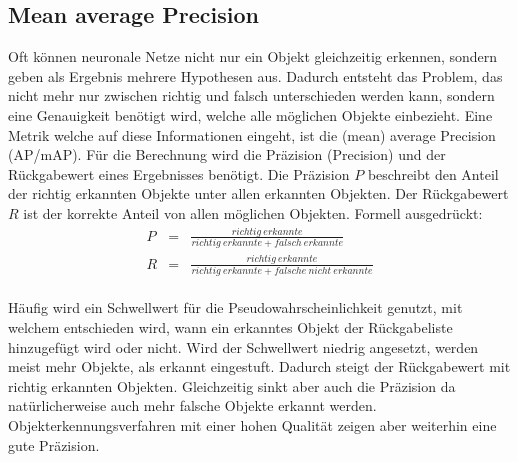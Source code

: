 \documentclass[a4paper,12pt,oneside]{article}
\begin{document}
  \subsection{Mean average Precision}\label{s.map}
Oft können neuronale Netze nicht nur ein Objekt gleichzeitig erkennen, sondern geben als Ergebnis mehrere Hypothesen aus. Dadurch entsteht das Problem, das nicht mehr nur zwischen richtig und falsch unterschieden werden kann, sondern eine Genauigkeit benötigt wird, welche alle möglichen Objekte einbezieht. Eine Metrik welche auf diese Informationen eingeht, ist die (mean) average Precision (AP/mAP). Für die Berechnung wird die Präzision (Precision) und der Rückgabewert eines Ergebnisses benötigt. Die Präzision $P$ beschreibt den Anteil der richtig erkannten Objekte unter allen erkannten Objekten. Der Rückgabewert $R$ ist der korrekte Anteil von allen möglichen Objekten. Formell ausgedrückt:\\
\begin{eqnarray}
P&=&\frac{richtig\medspace erkannte}{richtig\medspace erkannte + falsch\medspace erkannte}\\
R&=&\frac{richtig\medspace erkannte}{richtig\medspace erkannte + falsche\medspace nicht\medspace erkannte}
\end{eqnarray}\\
Häufig wird ein Schwellwert für die Pseudowahrscheinlichkeit genutzt, mit welchem entschieden wird, wann ein erkanntes Objekt der Rückgabeliste hinzugefügt wird oder nicht. Wird der Schwellwert niedrig angesetzt, werden meist mehr Objekte, als erkannt eingestuft. Dadurch steigt der Rückgabewert mit richtig erkannten Objekten. Gleichzeitig sinkt aber auch die Präzision da natürlicherweise auch mehr falsche Objekte erkannt werden. Objekterkennungsverfahren mit einer hohen Qualität zeigen aber weiterhin eine gute Präzision.
\end{document}
